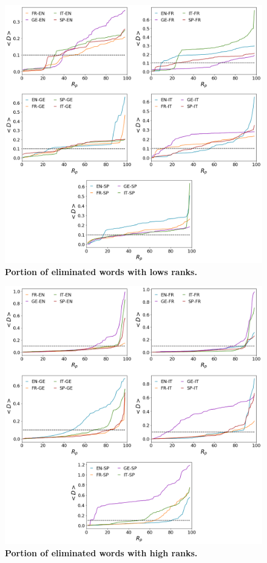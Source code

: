 \documentclass[10pt,letterpaper]{article} %
\begin{document}
\begin{figure}[!h]
	\begin{adjustwidth}{-2.5cm}{1cm}
		\centering
		\includegraphics[scale=.38]{Rp_bajos.png}
		\caption{{\bf Portion of eliminated words with lows ranks.} }
		\label{fig.RP_low}
	\end{adjustwidth}
\end{figure}


\begin{figure}[!h]
	\begin{adjustwidth}{-2.5cm}{1cm}
		\centering
		\includegraphics[scale=.38]{Rp_altos.png}
		\caption{{\bf Portion of eliminated words with high ranks.} }
		\label{fig.RP_high}
	\end{adjustwidth}
\end{figure}
\end{document}
